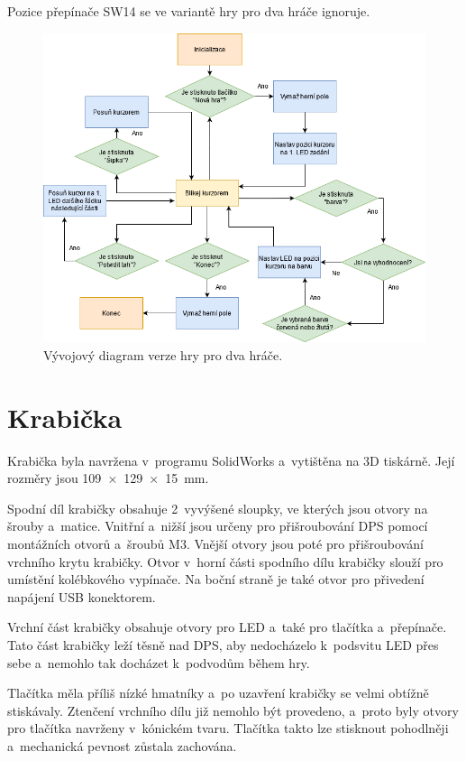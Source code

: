 Pozice přepínače SW14 se ve variantě hry pro dva hráče ignoruje. 

\begin{figure}[!h]
    \begin{center}
        \includegraphics[scale=0.6]{obrazky/vyvojovy_diagram_2_hraci.png}
    \end{center}
    \caption[Vývojový diagram verze hry pro dva hráče]{Vývojový diagram verze hry pro dva hráče.}
    \end{figure}

\chapter{Krabička}
Krabička byla navržena v~programu SolidWorks a~vytištěna na 3D tiskárně. Její rozměry jsou 109~$\times$~129~$\times$~15~mm. 

Spodní díl krabičky obsahuje 2~vyvýšené sloupky, ve kterých jsou otvory
na šrouby a~matice. Vnitřní a~nižší jsou určeny pro přišroubování DPS pomocí montážních otvorů a~šroubů M3. Vnější otvory jsou poté pro přišroubování 
vrchního krytu krabičky. Otvor v~horní části spodního dílu krabičky slouží pro umístění kolébkového vypínače. Na boční straně je také otvor
pro přivedení napájení USB konektorem.

Vrchní část krabičky obsahuje otvory pro LED a~také pro tlačítka a~přepínače. Tato část krabičky leží těsně nad DPS, aby nedocházelo k~podsvitu LED přes
sebe a~nemohlo tak docházet k~podvodům během hry. 

Tlačítka měla příliš nízké hmatníky a~po uzavření krabičky se velmi obtížně stiskávaly. 
Ztenčení vrchního dílu již nemohlo být provedeno, a~proto byly otvory pro tlačítka navrženy v~kónickém tvaru. Tlačítka takto lze stisknout pohodlněji
a~mechanická pevnost zůstala zachována. 

